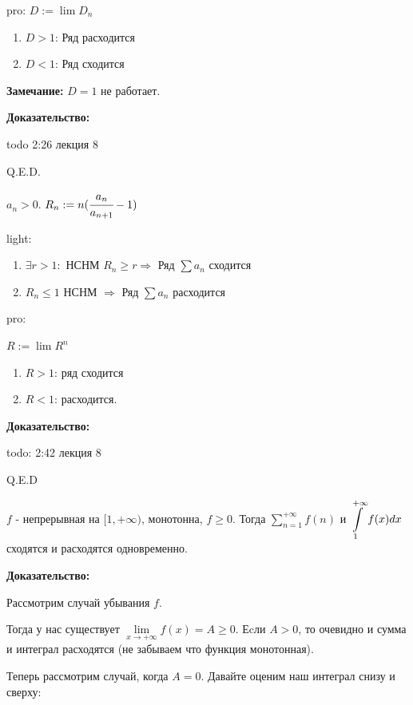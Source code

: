 pro: $D:= \lim D_n$
\begin{enumerate}
    \item $D>1$: Ряд расходится
    \item $D<1$: Ряд сходится
\end{enumerate}

\textbf{Замечание:} $D=1$ не работает.

\textbf{Доказательство:} 

todo 2:26 лекция 8

\hfill Q.E.D.


$a_n > 0$. $R_n := n(\cfrac{a_n}{a_{n+1}}-1)$

light:
\begin{enumerate}
    \item $\exists r>1:$ НСНМ $R_n \geq r \Rightarrow $ Ряд $\sum a_n$ сходится
    \item $R_n\leq 1$ НСНМ $\Rightarrow$ Ряд $\sum a_n$ расходится
\end{enumerate}
pro:

$R:= \lim R^n$
\begin{enumerate}
    \item $R>1$: ряд сходится
    \item $R<1$: расходится.
\end{enumerate}

\textbf{Доказательство:}

todo: 2:42 лекция 8

\hfill Q.E.D



$f$ - непрерывная на $[1,+\infty)$, монотонна, $f\geq 0 $. Тогда $\sum\limits_{n=1}^{+\infty}f(n)$ и $\displaystyle\int\limits_{1}^{+\infty}f(x)dx$ сходятся и расходятся одновременно.

\textbf{Доказательство:}

Рассмотрим случай убывания $f$. 

Тогда у нас существует $ \lim\limits_{x\rightarrow +\infty}f(x) = A \geq 0$. Еcли $A>0$, то очевидно и сумма и интеграл расходятся (не забываем что функция монотонная).

Теперь рассмотрим случай, когда $A = 0$. Давайте оценим наш интеграл снизу и сверху:

